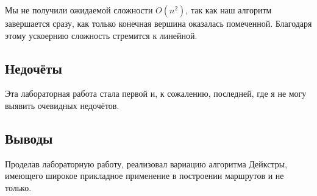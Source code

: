 \documentclass[12pt]{article}
\begin{document}
    Мы не получили ожидаемой сложности $O(n^2)$, так как наш алгоритм 
    завершается сразу, как только конечная вершина оказалась помеченной. 
    Благодаря этому ускоернию сложность стремится к линейной.

    \subsection*{Недочёты}

    Эта лабораторная работа стала первой и, к сожалению, последней, где я не 
    могу выявить очевидных недочётов.

    \subsection*{Выводы}

    Проделав лабораторную работу, реализовал вариацию алгоритма Дейкстры, 
    имеющего широкое прикладное применение в построении маршрутов и не только.
\end{document}
